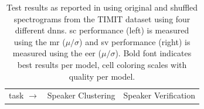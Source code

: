 \begin{table}[H]
	\centering
     \caption{Test results as reported in \cite{neururer2023deep} using original and shuffled spectrograms from the TIMIT dataset using four different \glspl{dnn}. \Gls{sc} performance (left) is measured using the \gls{mr} ($\mu/\sigma$) and \gls{sv} performance (right) is measured using the \gls{eer} ($\mu/\sigma$). Bold font indicates best results per model, cell coloring scales with quality per model.}
    	\begin{tabular}{ll|rrr|rrr}
    		\hline
    	 \multicolumn{2}{c|}{task $\rightarrow$}
    		 & \multicolumn{3}{c|}{Speaker Clustering}
    		 & \multicolumn{3}{c}{Speaker Verification} \\


\end{tabular}
\end{table}
